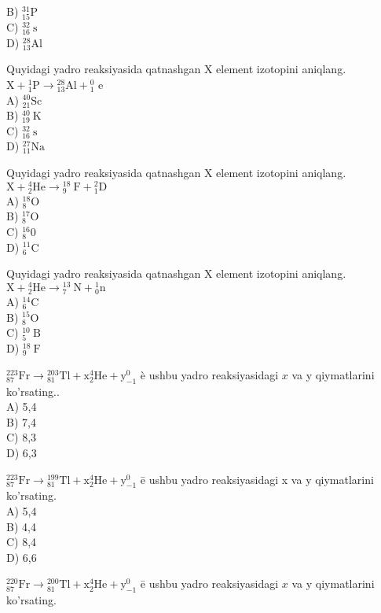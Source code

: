 B) ${ }_{15}^{31} \mathrm{P}$\\
C) ${ }_{16}^{32} \mathrm{~s}$\\
D) ${ }_{13}^{28} \mathrm{Al}$
  \item Quyidagi yadro reaksiyasida qatnashgan X element izotopini aniqlang. $\mathrm{X}+{ }_{1}^{1} \mathrm{P} \rightarrow{ }_{13}^{28} \mathrm{Al}+{ }_{1}^{0}$ e\\
A) ${ }_{21}^{40} \mathrm{Sc}$\\
B) ${ }_{19}^{40} \mathrm{~K}$\\
C) ${ }_{16}^{32} \mathrm{~s}$\\
D) ${ }_{11}^{27} \mathrm{Na}$
  \item Quyidagi yadro reaksiyasida qatnashgan X element izotopini aniqlang. $\mathrm{X}+{ }_{2}^{4} \mathrm{He} \rightarrow{ }_{9}^{18} \mathrm{~F}+{ }_{1}^{2} \mathrm{D}$\\
A) ${ }_{8}^{18} \mathrm{O}$\\
B) ${ }_{8}^{17} \mathrm{O}$\\
C) ${ }_{8}^{16} 0$\\
D) ${ }_{6}^{11} \mathrm{C}$
  \item Quyidagi yadro reaksiyasida qatnashgan X element izotopini aniqlang. $\mathrm{X}+{ }_{2}^{4} \mathrm{He} \rightarrow{ }_{7}^{13} \mathrm{~N}+{ }_{0}^{1} \mathrm{n}$\\
A) ${ }_{6}^{14} \mathrm{C}$\\
B) ${ }_{8}^{15} \mathrm{O}$\\
C) ${ }_{5}^{10} \mathrm{~B}$\\
D) ${ }_{9}^{18} \mathrm{~F}$
  \item ${ }_{87}^{223} \mathrm{Fr} \rightarrow{ }_{81}^{203} \mathrm{Tl}+\mathrm{x}_{2}^{4} \mathrm{He}+\mathrm{y}_{-1}^{0}$ è ushbu yadro reaksiyasidagi $x$ va y qiymatlarini ko'rsating..\\
A) 5,4\\
B) 7,4\\
C) 8,3\\
D) 6,3
  \item ${ }_{87}^{223} \mathrm{Fr} \rightarrow{ }_{81}^{199} \mathrm{Tl}+\mathrm{x}_{2}^{4} \mathrm{He}+\mathrm{y}_{-1}^{0}$ ē ushbu yadro reaksiyasidagi x va y qiymatlarini ko'rsating.\\
A) 5,4\\
B) 4,4\\
C) 8,4\\
D) 6,6
  \item ${ }_{87}^{220} \mathrm{Fr} \rightarrow{ }_{81}^{200} \mathrm{Tl}+\mathrm{x}_{2}^{4} \mathrm{He}+\mathrm{y}_{-1}^{0}$ ē ushbu yadro reaksiyasidagi $x$ va y qiymatlarini ko'rsating.\\
